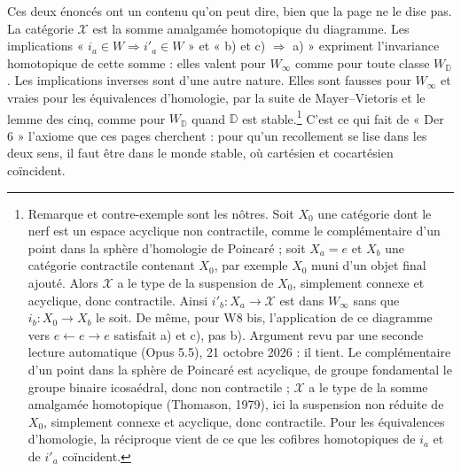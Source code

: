 \documentclass[11pt,a4paper]{article}
\begin{document}
Ces deux énoncés ont un contenu qu'on peut dire, bien que la page ne le dise
pas. La catégorie $\mathcal{X}$ est la somme amalgamée homotopique du
diagramme. Les implications « $i_a \in W \Rightarrow i'_a \in W$ » et « b) et
c) $\Rightarrow$ a) » expriment l'invariance homotopique de cette somme : elles
valent pour $W_\infty$ comme pour toute classe $W_{\mathbb D}$. Les
implications inverses sont d'une autre nature. Elles sont fausses pour
$W_\infty$ et vraies pour les équivalences d'homologie, par la suite de
Mayer--Vietoris et le lemme des cinq, comme pour $W_{\mathbb D}$ quand
$\mathbb D$ est stable.\footnote{Remarque et contre-exemple sont les nôtres.
Soit $X_0$ une catégorie dont le nerf est un espace acyclique non contractile,
comme le complémentaire d'un point dans la sphère d'homologie de Poincaré ;
soit $X_a = e$ et $X_b$ une catégorie contractile contenant $X_0$, par exemple
$X_0$ muni d'un objet final ajouté. Alors $\mathcal{X}$ a le type de la
suspension de $X_0$, simplement connexe et acyclique, donc contractile. Ainsi
$i'_b : X_a \to \mathcal{X}$ est dans $W_\infty$ sans que $i_b : X_0 \to X_b$
le soit. De même, pour W8 bis, l'application de ce diagramme vers $e
\leftarrow e \rightarrow e$ satisfait a) et c), pas b). Argument revu par une seconde lecture automatique (Opus 5.5), 21 octobre 2026 : il tient. Le complémentaire d'un point dans la sphère de Poincaré est acyclique, de groupe fondamental le groupe binaire icosaédral, donc non contractile ; $\mathcal{X}$ a le type de la somme amalgamée homotopique (Thomason, 1979), ici la suspension non réduite de $X_0$, simplement connexe et acyclique, donc contractile. Pour les équivalences d'homologie, la réciproque vient de ce que les cofibres homotopiques de $i_a$ et de $i'_a$ coïncident.} C'est ce qui fait de
« Der 6 » l'axiome que ces pages cherchent : pour qu'un recollement se lise
dans les deux sens, il faut être dans le monde stable, où cartésien et
cocartésien coïncident.
\end{document}
